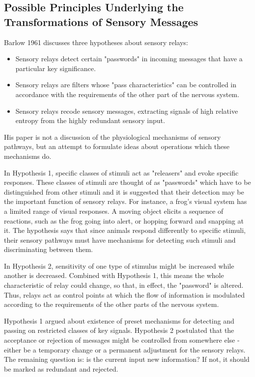 \documentclass[twoside]{article}
\begin{document}
\begin{multicols}{2}

\section{Possible Principles Underlying the Transformations of Sensory Messages}

Barlow 1961 discusses three hypotheses about sensory relays:
\begin{itemize}
	\item Sensory relays detect certain "passwords" in incoming messages that have a particular key significance.
	\item Sensory relays are filters whose "pass characteristics" can be controlled in accordance with the requirements of the other part of the nervous system.
	\item Sensory relays recode sensory messages, extracting signals of high relative entropy from the highly redundant sensory input.
\end{itemize}
His paper is not a discussion of the physiological mechanisms of sensory pathways, but an attempt to formulate ideas about operations which these mechanisms do. 

In Hypothesis 1, specific classes of stimuli act as "releasers" and evoke specific responses. These classes of stimuli are thought of as "passwords" which have to be distinguished from other stimuli and it is suggested that their detection may be the important function of sensory relays. For instance, a frog's visual system has a limited range of visual responses. A moving object elicits a sequence of reactions, such as the frog going into alert, or hopping forward and snapping at it. The hypothesis says that since animals respond differently to specific stimuli, their sensory pathways must have mechanisms for detecting such stimuli and discriminating between them. 

In Hypothesis 2, sensitivity of one type of stimulus might be increased while another is decreased. Combined with Hypothesis 1, this means the whole characteristic of relay could change, so that, in effect, the "password" is altered. Thus, relays act as control points at which the flow of information is modulated according to the requirements of the other parts of the nervous system.

Hypothesis 1 argued about existence of preset mechanisms for detecting and passing on restricted classes of key signals. Hypothesis 2 postulated that the acceptance or rejection of messages might be controlled from somewhere else - either be a temporary change or a permanent adjustment for the sensory relays. The remaining question is: is the current input new information? If not, it should be marked as redundant and rejected. 


\end{multicols}
\end{document}
